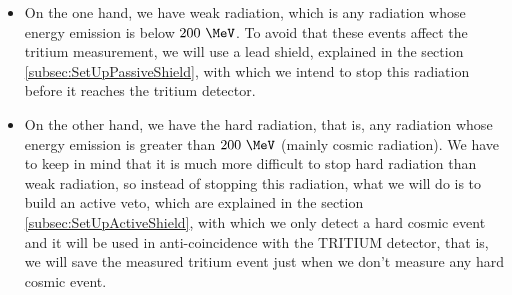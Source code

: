 \begin{itemize}

\item{}  On the one hand, we have weak radiation, which is any radiation whose energy emission is below $200~\MeV$. To avoid that these events affect the tritium measurement, we will use a lead shield, explained in the section \ref{subsec:SetUpPassiveShield}, with which we intend to stop this radiation before it reaches the tritium detector.

\item{} On the other hand, we have the hard radiation, that is, any radiation whose energy emission is greater than $200~\MeV$ (mainly cosmic radiation). We have to keep in mind that it is much more difficult to stop hard radiation than weak radiation, so instead of stopping this radiation, what we will do is to build an active veto, which are explained in the section \ref{subsec:SetUpActiveShield}, with which we only detect a hard cosmic event and it will be used in anti-coincidence with the TRITIUM detector, that is, we will save the measured tritium event just when we don't measure any hard cosmic event.

\end{itemize}